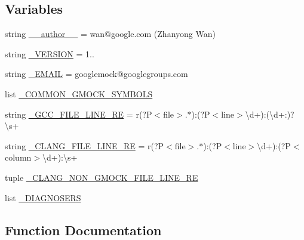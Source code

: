\subsection*{Variables}
\begin{DoxyCompactItemize}
\item 
string \mbox{\hyperlink{namespacescripts_1_1gmock__doctor_a62ff35b79fcdc5bb65666d61573e540c}{\+\_\+\+\_\+author\+\_\+\+\_\+}} = \textquotesingle{}wan@google.\+com (Zhanyong Wan)\textquotesingle{}
\item 
string \mbox{\hyperlink{namespacescripts_1_1gmock__doctor_aa4f1535d4db167d9163f7245ccc35e26}{\+\_\+\+V\+E\+R\+S\+I\+ON}} = \textquotesingle{}1..\textquotesingle{}
\item 
string \mbox{\hyperlink{namespacescripts_1_1gmock__doctor_af1fbc3517760f89ea7e5daeee9dbaabb}{\+\_\+\+E\+M\+A\+IL}} = \textquotesingle{}googlemock@googlegroups.\+com\textquotesingle{}
\item 
list \mbox{\hyperlink{namespacescripts_1_1gmock__doctor_a76bcb3f48669600b95cdfd35d7d4a172}{\+\_\+\+C\+O\+M\+M\+O\+N\+\_\+\+G\+M\+O\+C\+K\+\_\+\+S\+Y\+M\+B\+O\+LS}}
\item 
string \mbox{\hyperlink{namespacescripts_1_1gmock__doctor_a7d70a5e2921b5b294a55e39857963ed1}{\+\_\+\+G\+C\+C\+\_\+\+F\+I\+L\+E\+\_\+\+L\+I\+N\+E\+\_\+\+RE}} = r\textquotesingle{}(?P$<$file$>$.$\ast$)\+:(?P$<$line$>$\textbackslash{}d+)\+:(\textbackslash{}d+\+:)?\textbackslash{}s+\textquotesingle{}
\item 
string \mbox{\hyperlink{namespacescripts_1_1gmock__doctor_a909f5d793ae7a74df3075760b0289451}{\+\_\+\+C\+L\+A\+N\+G\+\_\+\+F\+I\+L\+E\+\_\+\+L\+I\+N\+E\+\_\+\+RE}} = r\textquotesingle{}(?P$<$file$>$.$\ast$)\+:(?P$<$line$>$\textbackslash{}d+)\+:(?P$<$column$>$\textbackslash{}d+)\+:\textbackslash{}s+\textquotesingle{}
\item 
tuple \mbox{\hyperlink{namespacescripts_1_1gmock__doctor_ab6245dbb3292d0fd333956d01a909b7d}{\+\_\+\+C\+L\+A\+N\+G\+\_\+\+N\+O\+N\+\_\+\+G\+M\+O\+C\+K\+\_\+\+F\+I\+L\+E\+\_\+\+L\+I\+N\+E\+\_\+\+RE}}
\item 
list \mbox{\hyperlink{namespacescripts_1_1gmock__doctor_a275031d52a2133eb194f7d04df2730a6}{\+\_\+\+D\+I\+A\+G\+N\+O\+S\+E\+RS}}
\end{DoxyCompactItemize}


\subsection{Function Documentation}
\mbox{\label{namespacescripts_1_1gmock__doctor_a0c2de0f6719fa2f238d319a8a0a21db4}} 
